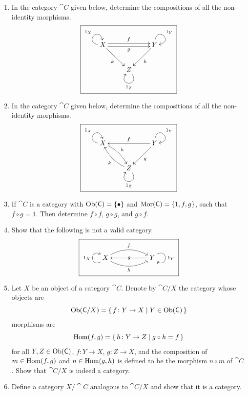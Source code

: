 \begin{Exercise}
\begin{enumerate}
\item In the category $\cat C$ given below, determine the compositions of all the non-identity morphisms.
\begin{equation*}
\boxed{\xymatrix{
	X \ar @(l, u)^{1_X} \ar @<+0.5ex>[rr]^f \ar @<-0.5ex>[rr]_g  \ar [dr]_k && Y \ar @(u, r)^{1_Y}  \ar[ld]^h \\
	& Z \ar @(dr, dl)^{1_Z} 
}}
\end{equation*}

\item In the category $\cat C$ given below, determine the compositions of all the non-identity morphisms.
\begin{equation*}
\boxed{\xymatrix{
	X \ar @(l, u)^{1_X} \ar @/^/[dr]^h && Y \ar @(u, r)^{1_Y} \ar[ll]_f \ar[ld]^g \\
	& Z \ar @(dr, dl)^{1_Z} \ar @/^/[ul]^k
}}
\end{equation*}

\item If $\cat C$ is a category with $\operatorname{Ob}(\mathsf{C}) = \{ \bullet \}$ and $\operatorname{Mor}(\mathsf{C}) = \{1, f, g\}$, such that $f \circ g = 1$. Then determine $f \circ f$, $g \circ g$, and $g \circ f$.

\item Show that the following is not a valid category.
\begin{equation*}
\boxed{\xymatrix{
	X \ar @(ld, lu)^{1_X} \ar  @/^1pc/[rr]^f  \ar  @/_1pc/[rr]_h && Y \ar @(ru, rd)^{1_Y}  \ar[ll]|-g
}}
\end{equation*}

\item Let $X$ be an object of a category $\cat C$. Denote by $\cat C / X$ the category whose objects are
\begin{equation*}
\operatorname{Ob}(\mathsf{C} / X) = \qty{\, f \colon Y \to X \mid Y \in \operatorname{Ob}(\mathsf{C}) \,}
\end{equation*}
morphisms are
\begin{equation*}
\operatorname{Hom}(f, g) = \qty{\, h \colon Y \to Z \mid g \circ h = f \,}
\end{equation*}
for all $Y, Z \in \operatorname{Ob}(\mathsf{C})$, $f \colon Y \to X$, $g \colon Z \to X$, and the composition of $m \in \operatorname{Hom}(f, g)$ and $n \in \operatorname{Hom}(g, h)$ is defined to be the morphism $n \circ m$ of $\cat C$ . Show that $\cat C / X$ is indeed a category.

\item Define a category $X / \cat C$ analogous to $\cat C / X$ and show that it is a category.


\end{enumerate}
\end{Exercise}
